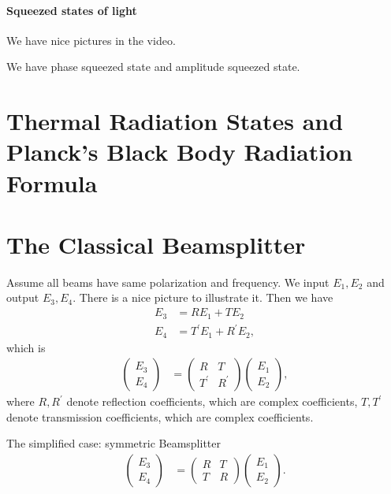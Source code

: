 \documentclass[../../note.tex]{subfiles}
\begin{document}
\paragraph{Squeezed states of light}
We have nice pictures in the video.

We have phase squeezed state and amplitude squeezed state.

\section{Thermal Radiation States and Planck's Black Body Radiation Formula}

\section{The Classical Beamsplitter}
Assume all beams have same polarization and frequency. We input $E_1, E_2$ and output $E_3, E_4$. There is a nice picture to illustrate it. Then we have
\begin{align}
    E_3 
    &= R E_1 + T E_2 \\
    E_4 
    &= T^\prime E_1 + R^\prime E_2,
\end{align}
which is 
\begin{align}
    \left(\begin{matrix}
        E_3 \\
        E_4
    \end{matrix}\right)
    &=  \left(\begin{matrix}
        R & T \\
        T^\prime & R^\prime 
    \end{matrix}\right) 
    \left(\begin{matrix}
        E_1 \\
        E_2
    \end{matrix}\right),
\end{align}
where $R, R^\prime$ denote reflection coefficients, which are complex coefficients, $T, T^\prime$ denote transmission coefficients, which are complex coefficients. 

The simplified case: symmetric Beamsplitter
\begin{align}
    \label{eq: classical beam splitter}
    \left(\begin{matrix}
        E_3 \\
        E_4
    \end{matrix}\right)
    &=  \left(\begin{matrix}
        R & T \\
        T & R 
    \end{matrix}\right) 
    \left(\begin{matrix}
        E_1 \\
        E_2
    \end{matrix}\right).
\end{align}
\end{document}
